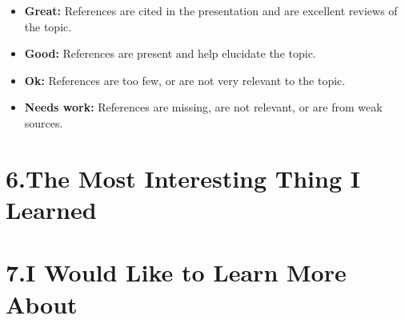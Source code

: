 \documentclass[12pt]{article}
\newcommand{\rubricitem}[2]{\textbf{#1:} #2}
\begin{document}
\begin{itemize}[leftmargin=1.5em, itemsep=0.4em]
    \item[$\square$] \rubricitem{Great}{References are cited in the presentation and are excellent reviews of the topic.}
    \item[$\square$] \rubricitem{Good}{References are present and help elucidate the topic.}
    \item[$\square$] \rubricitem{Ok}{References are too few, or are not very relevant to the topic.}
    \item[$\square$] \rubricitem{Needs work}{References are missing, are not relevant, or are from weak sources.}
\end{itemize}

\section*{6.\quad The Most Interesting Thing I Learned}

\vspace{5cm}

\section*{7.\quad I Would Like to Learn More About}


\vspace{5cm}
\end{document}
